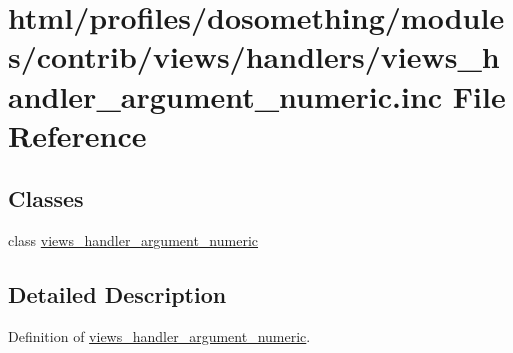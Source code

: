 \hypertarget{views__handler__argument__numeric_8inc}{
\section{html/profiles/dosomething/modules/contrib/views/handlers/views\_\-handler\_\-argument\_\-numeric.inc File Reference}
\label{views__handler__argument__numeric_8inc}
}
\subsection*{Classes}
\begin{DoxyCompactItemize}
\item 
class \hyperlink{classviews__handler__argument__numeric}{views\_\-handler\_\-argument\_\-numeric}
\end{DoxyCompactItemize}


\subsection{Detailed Description}
Definition of \hyperlink{classviews__handler__argument__numeric}{views\_\-handler\_\-argument\_\-numeric}. 
